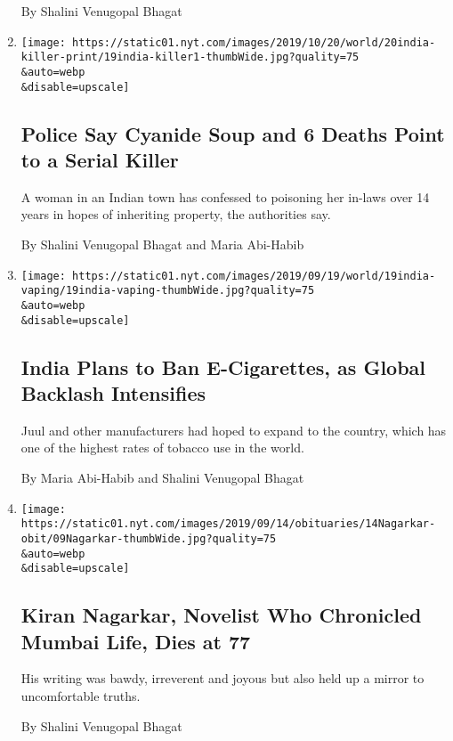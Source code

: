 \begin{enumerate}
  By Shalini Venugopal Bhagat
\item
  \href{/2019/10/19/world/asia/india-koodathayai-murder.html}{}

  \texttt{[image: https://static01.nyt.com/images/2019/10/20/world/20india-killer-print/19india-killer1-thumbWide.jpg?quality=75\\\&auto=webp\\\&disable=upscale]}

  \hypertarget{police-say-cyanide-soup-and-6-deaths-point-to-a-serial-killer}{%
  \subsection{Police Say Cyanide Soup and 6 Deaths Point to a Serial
  Killer}\label{police-say-cyanide-soup-and-6-deaths-point-to-a-serial-killer}}

  A woman in an Indian town has confessed to poisoning her in-laws over
  14 years in hopes of inheriting property, the authorities say.

  By Shalini Venugopal Bhagat and Maria Abi-Habib
\item
  \href{/2019/09/19/world/asia/india-vaping-ban-e-cigarettes.html}{}

  \texttt{[image: https://static01.nyt.com/images/2019/09/19/world/19india-vaping/19india-vaping-thumbWide.jpg?quality=75\\\&auto=webp\\\&disable=upscale]}

  \hypertarget{india-plans-to-ban-e-cigarettes-as-global-backlash-intensifies}{%
  \subsection{India Plans to Ban E-Cigarettes, as Global Backlash
  Intensifies}\label{india-plans-to-ban-e-cigarettes-as-global-backlash-intensifies}}

  Juul and other manufacturers had hoped to expand to the country, which
  has one of the highest rates of tobacco use in the world.

  By Maria Abi-Habib and Shalini Venugopal Bhagat
\item
  \href{/2019/09/11/books/kiran-nagarkar-dead.html}{}

  \texttt{[image: https://static01.nyt.com/images/2019/09/14/obituaries/14Nagarkar-obit/09Nagarkar-thumbWide.jpg?quality=75\\\&auto=webp\\\&disable=upscale]}

  \hypertarget{kiran-nagarkar-novelist-who-chronicled-mumbai-life-dies-at-77}{%
  \subsection{Kiran Nagarkar, Novelist Who Chronicled Mumbai Life, Dies
  at
  77}\label{kiran-nagarkar-novelist-who-chronicled-mumbai-life-dies-at-77}}

  His writing was bawdy, irreverent and joyous but also held up a mirror
  to uncomfortable truths.

  By Shalini Venugopal Bhagat
\end{enumerate}


